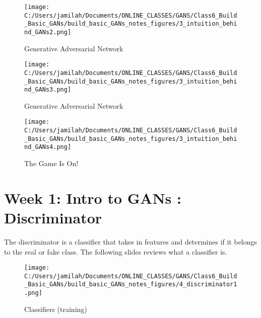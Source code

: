 \documentclass[11pt, onecolumn]{article}
\begin{document}
\begin{figure}[htp]
\begin{center}
\texttt{[image: C:/Users/jamilah/Documents/ONLINE\_CLASSES/GANS/Class6\_Build\_Basic\_GANs/build\_basic\_GANs\_notes\_figures/3\_intuition\_behind\_GANs2.png]}
\end{center}
\caption{Generative Adversarial Network}
\label{3_intuition_behind_GANs2}
\end{figure}

\begin{figure}[htp]
\begin{center}
\texttt{[image: C:/Users/jamilah/Documents/ONLINE\_CLASSES/GANS/Class6\_Build\_Basic\_GANs/build\_basic\_GANs\_notes\_figures/3\_intuition\_behind\_GANs3.png]}
\end{center}
\caption{Generative Adversarial Network}
\label{3_intuition_behind_GANs3}
\end{figure}

\begin{figure}[htp]
\begin{center}
\texttt{[image: C:/Users/jamilah/Documents/ONLINE\_CLASSES/GANS/Class6\_Build\_Basic\_GANs/build\_basic\_GANs\_notes\_figures/3\_intuition\_behind\_GANs4.png]}
\end{center}
\caption{The Game Is On!}
\label{3_intuition_behind_GANs4}
\end{figure}


\section{Week 1: Intro to GANs : Discriminator}

The discriminator is a classifier that takes in features and determines if it belongs to the real or fake class.  The following slides reviews what a classifier is.

\begin{figure}[htp]
\begin{center}
\texttt{[image: C:/Users/jamilah/Documents/ONLINE\_CLASSES/GANS/Class6\_Build\_Basic\_GANs/build\_basic\_GANs\_notes\_figures/4\_discriminator1.png]}
\end{center}
\caption{Classifiers (training)}
\label{4_discriminator1}
\end{figure}
\end{document}

